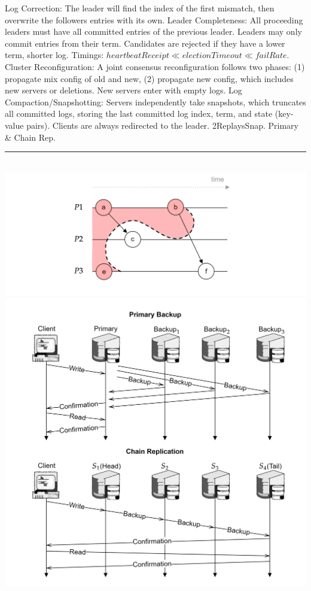 \begin{multicols}{2}
    Log Correction: The leader will find the index of the first mismatch, then overwrite the followers entries with its own. Leader Completeness: All proceeding leaders must have all committed entries of the previous leader.
    Leaders may only commit entries from their term. Candidates are rejected if they have a lower term, shorter log. Timings: $heartbeatReceipt \ll electionTimeout \ll failRate$. 
    Cluster Reconfiguration: A joint consensus reconfiguration follows two phases: (1) propagate mix config of old and new, (2) propagate new config, which includes new servers or deletions. New servers
    enter with empty logs. Log Compaction/Snapshotting: Servers independently take snapshots, which truncates all committed logs, storing the last committed log index, term, and state (key-value pairs).
    Clients are always redirected to the leader. 2ReplaysSnap. Primary \& Chain Rep.\\
    \noindent
    \rule{\linewidth}{0.4pt}\\
    \includegraphics[width=\linewidth]{Sections/snap/snap_2.png}\\
    \vspace{-2.5em}
    \noindent
    \includegraphics[width=\linewidth]{Sections/rep/comp.png}\\
    
\end{multicols}

